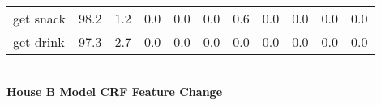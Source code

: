 \documentclass{article}
\begin{document}
\begin{sideways}
\begin{tabular}{lrrrrrrrrrr}
get snack         &        98.2 &                1.2 &               0.0 &                0.0 &                0.0 &              0.6 &                      0.0 &                   0.0 &              0.0 &              0.0 \\
get drink         &        97.3 &                2.7 &               0.0 &                0.0 &                0.0 &              0.0 &                      0.0 &                   0.0 &              0.0 &              0.0 \\
\bottomrule
\end{tabular}
\end{sideways}
\normalsize
\vspace{1cm}\\
\textbf{House B Model CRF Feature Change}\\
\vspace{1cm}\\
\end{document}
